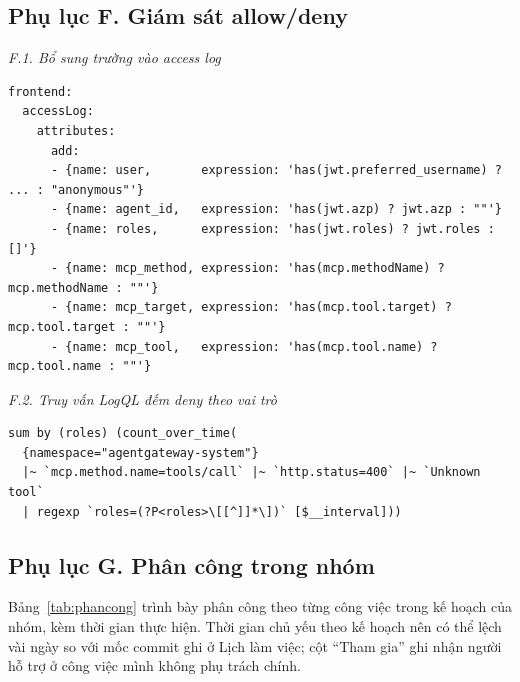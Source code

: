\documentclass[a4paper]{article}
\begin{document}
\subsection*{Phụ lục F. Giám sát allow/deny}
\textit{F.1. Bổ sung trường vào access log}
\par\noindent\begin{minipage}{\linewidth}
\begin{lstlisting}
frontend:
  accessLog:
    attributes:
      add:
      - {name: user,       expression: 'has(jwt.preferred_username) ? ... : "anonymous"'}
      - {name: agent_id,   expression: 'has(jwt.azp) ? jwt.azp : ""'}
      - {name: roles,      expression: 'has(jwt.roles) ? jwt.roles : []'}
      - {name: mcp_method, expression: 'has(mcp.methodName) ? mcp.methodName : ""'}
      - {name: mcp_target, expression: 'has(mcp.tool.target) ? mcp.tool.target : ""'}
      - {name: mcp_tool,   expression: 'has(mcp.tool.name) ? mcp.tool.name : ""'}
\end{lstlisting}
\end{minipage}\par
{}\textit{F.2. Truy vấn LogQL đếm deny theo vai trò}
\par\noindent\begin{minipage}{\linewidth}
\begin{lstlisting}
sum by (roles) (count_over_time(
  {namespace="agentgateway-system"}
  |~ `mcp.method.name=tools/call` |~ `http.status=400` |~ `Unknown tool`
  | regexp `roles=(?P<roles>\[[^]]*\])` [$__interval]))
\end{lstlisting}
\end{minipage}\par

\subsection*{Phụ lục G. Phân công trong nhóm}
\setcounter{table}{0}
Bảng~\ref{tab:phancong} trình bày phân công theo từng công việc trong kế hoạch của nhóm, kèm thời gian thực hiện. Thời gian chủ yếu theo kế hoạch nên có thể lệch vài ngày so với mốc commit ghi ở Lịch làm việc; cột ``Tham gia'' ghi nhận người hỗ trợ ở công việc mình không phụ trách chính.
\end{document}
